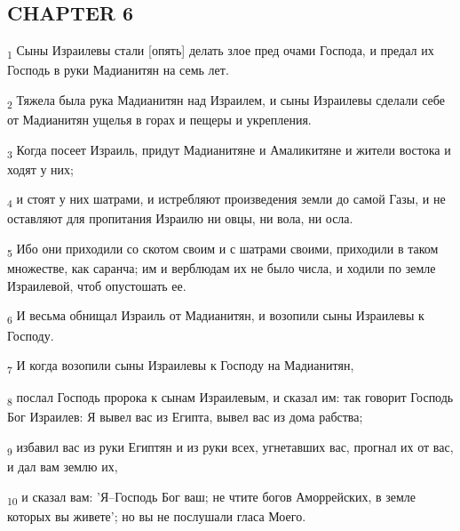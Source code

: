 \subsection{CHAPTER 6}
\begin{tcolorbox}
\textsubscript{1} Сыны Израилевы стали [опять] делать злое пред очами Господа, и предал их Господь в руки Мадианитян на семь лет.
\end{tcolorbox}
\begin{tcolorbox}
\textsubscript{2} Тяжела была рука Мадианитян над Израилем, и сыны Израилевы сделали себе от Мадианитян ущелья в горах и пещеры и укрепления.
\end{tcolorbox}
\begin{tcolorbox}
\textsubscript{3} Когда посеет Израиль, придут Мадианитяне и Амаликитяне и жители востока и ходят у них;
\end{tcolorbox}
\begin{tcolorbox}
\textsubscript{4} и стоят у них шатрами, и истребляют произведения земли до самой Газы, и не оставляют для пропитания Израилю ни овцы, ни вола, ни осла.
\end{tcolorbox}
\begin{tcolorbox}
\textsubscript{5} Ибо они приходили со скотом своим и с шатрами своими, приходили в таком множестве, как саранча; им и верблюдам их не было числа, и ходили по земле Израилевой, чтоб опустошать ее.
\end{tcolorbox}
\begin{tcolorbox}
\textsubscript{6} И весьма обнищал Израиль от Мадианитян, и возопили сыны Израилевы к Господу.
\end{tcolorbox}
\begin{tcolorbox}
\textsubscript{7} И когда возопили сыны Израилевы к Господу на Мадианитян,
\end{tcolorbox}
\begin{tcolorbox}
\textsubscript{8} послал Господь пророка к сынам Израилевым, и сказал им: так говорит Господь Бог Израилев: Я вывел вас из Египта, вывел вас из дома рабства;
\end{tcolorbox}
\begin{tcolorbox}
\textsubscript{9} избавил вас из руки Египтян и из руки всех, угнетавших вас, прогнал их от вас, и дал вам землю их,
\end{tcolorbox}
\begin{tcolorbox}
\textsubscript{10} и сказал вам: 'Я--Господь Бог ваш; не чтите богов Аморрейских, в земле которых вы живете'; но вы не послушали гласа Моего.
\end{tcolorbox}
